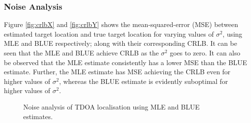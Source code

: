\documentclass[11pt]{article}
\begin{document}

\subsubsection*{Noise Analysis}
\label{subsubsec:noiseAnalysis}

Figure \ref{fig:crlbX} and \ref{fig:crlbY} shows the mean-squared-error (MSE) between estimated target location and true target location for varying values of $\sigma^{2}$, using MLE and BLUE respectively; along with their corresponding CRLB. It can be seen that the MLE and BLUE achieve CRLB as the $
\sigma^{2}$ goes to zero. It can also be observed that the MLE estimate consistently has a lower MSE than the BLUE estimate. Further, the MLE estimate has MSE achieving the CRLB even for higher values of $\sigma^{2}$, whereas the BLUE estimate is evidently suboptimal for higher values of $\sigma^{2}$.
\begin{figure}[t!]
\centering
{}
\caption{Noise analysis of TDOA localisation using MLE and BLUE estimates.}
\end{figure}
\end{document}
